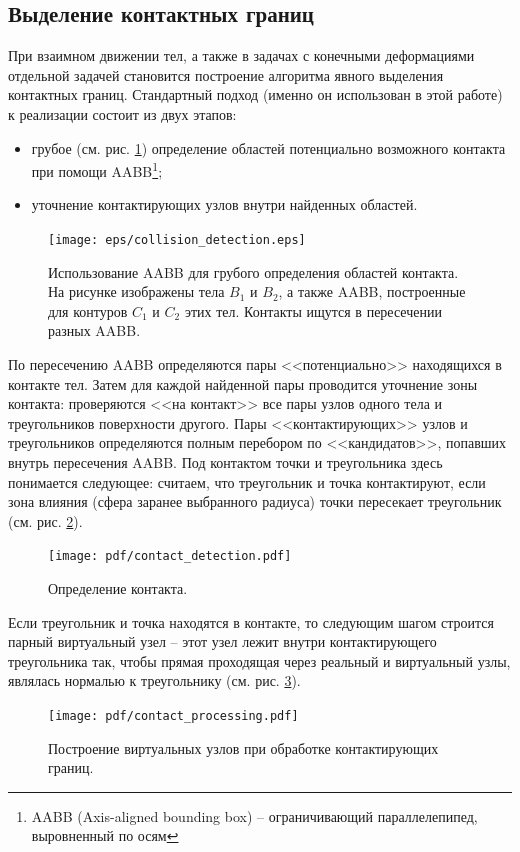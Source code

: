 \subsection{Выделение контактных границ}

При взаимном движении тел, а также в задачах с конечными деформациями отдельной задачей становится построение алгоритма явного выделения контактных границ. Стандартный подход (именно он использован в этой работе) к реализации состоит из двух этапов:
\begin{itemize}
	\item грубое (см. рис. \ref{pic:collision_detection}) определение областей потенциально возможного контакта при помощи AABB\footnote{AABB (Axis-aligned bounding box) -- ограничивающий параллелепипед, выровненный по осям };
	\item уточнение контактирующих узлов внутри найденных областей.
\end{itemize}
\begin{figure}[htp]
\centering
\texttt{[image: eps/collision\_detection.eps]}
\caption{Использование AABB для грубого определения областей контакта. На
рисунке изображены тела $B_1$ и $B_2$, а также AABB, построенные для контуров
$C_1$ и $C_2$ этих тел. Контакты ищутся в пересечении разных AABB.}
\label{pic:collision_detection}
\end{figure}
По пересечению AABB определяются пары <<потенциально>> находящихся в контакте тел. Затем для каждой найденной пары проводится уточнение зоны контакта: проверяются <<на контакт>> все пары узлов одного тела и треугольников поверхности другого. Пары <<контактирующих>> узлов и треугольников определяются полным перебором по <<кандидатов>>, попавших внутрь пересечения AABB. Под контактом точки и треугольника здесь понимается следующее: считаем, что треугольник и точка контактируют, если зона влияния (сфера заранее выбранного радиуса) точки пересекает треугольник (см. рис. \ref{pic:contact_detection}).
\begin{figure}[htp]
\centering
\texttt{[image: pdf/contact\_detection.pdf]}
\caption{Определение контакта.}
\label{pic:contact_detection}
\end{figure}
Если треугольник и точка находятся в контакте, то следующим шагом строится парный виртуальный узел -- этот узел лежит внутри контактирующего треугольника так, чтобы прямая проходящая через реальный и виртуальный узлы, являлась нормалью к треугольнику (см. рис. \ref{pic:contact_processing}).
\begin{figure}[htp]
\centering
\texttt{[image: pdf/contact\_processing.pdf]}
\caption{Построение виртуальных узлов при обработке контактирующих границ.}
\label{pic:contact_processing}
\end{figure}
